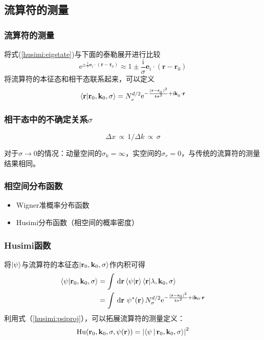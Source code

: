\documentclass[UTF8]{beamer}
\begin{document}
\subsection{流算符的测量}
\begin{frame}
    \frametitle{流算符的测量}
    将式(\ref{husimi:eigstate})与下面的泰勒展开进行比较
    \begin{equation}
        \mathrm{e}^{\pm\frac{\mathrm{i}}{\sigma}\mathbf{e}_i\cdot(\mathbf{r}-\mathbf{r}_0)}\approx 1\pm
        \frac{\mathrm{i}}{\sigma}\mathbf{e}_i\cdot(\mathbf{r}-\mathbf{r}_0)
    \end{equation}
    将流算符的本征态和相干态联系起来，可以定义
    \begin{equation}
        \braket{\mathbf{r}|\mathbf{r}_0,\mathbf{k}_0,\sigma}=
        N_{_\sigma}^{d/2}\mathrm{e}^{-\frac{(\mathbf{r}-\mathbf{r}_{_0})^2}{4\sigma^2}+\mathrm{i}\mathbf{k}_{_0}\cdot\mathbf{r}}
    \end{equation}
\end{frame}
\begin{frame}
    \frametitle{相干态中的不确定关系$\sigma$}
    \begin{equation}
        \Delta x \,\propto\, 1/\Delta k \,\propto\, \sigma
    \end{equation}
    \begin{block}{}
        对于$\sigma \rightarrow 0$的情况：动量空间的$\sigma_k=\infty$，实空间的$\sigma_r=0$，与传统的流算符的测量结果相同。
    \end{block}
\end{frame}
\begin{frame}
    \frametitle{相空间分布函数}
    \begin{itemize}
        \item Wigner准概率分布函数
        \item Husimi分布函数（相空间的概率密度）
    \end{itemize}
\end{frame}
\begin{frame}
    \frametitle{Husimi函数}
    将$\ket{\psi}$与流算符的本征态$\ket{\mathbf{r}_0,\mathbf{k}_0,\sigma}$作内积可得
    \begin{align}
        \braket{\mathbf{\psi}|\mathbf{r}_0,\mathbf{k}_0,\sigma} &= \int \,\mathrm{d}\mathbf{r}\braket{\mathbf{\psi}|\mathbf{r}}\braket{\mathbf{r}|\lambda,\mathbf{k}_0,\sigma}\\
        &= \int \,\mathrm{d}\mathbf{r}\ \psi^{*}(\mathbf{r})\,N_{\sigma}^{d/2}\mathrm{e}^{-\frac{(\mathbf{r}-\mathbf{r}_0)^2}{4\sigma^2}+\mathrm{i}\mathbf{k}_0\cdot\mathbf{r}} 
        \label{husimi:psiproj}
    \end{align}
    利用式（\ref{husimi:psiproj}），可以拓展流算符的测量定义：
    \begin{equation}
        \mathrm{Hu}(\mathbf{r}_0,\mathbf{k}_0, \sigma,\psi(\mathbf{r}))=\left\lvert\Braket{\mathbf{\psi}|\mathbf{r}_0,\mathbf{k}_0,\sigma}\right\rvert^2  
        \label{husimi:function}
    \end{equation}
\end{frame}
\end{document}
